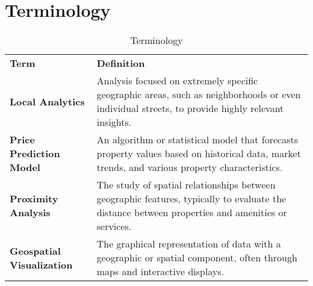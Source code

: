 \newpage

\section{Terminology}

\begin{table}[htbp]
	\centering
	\renewcommand{\arraystretch}{1.3}
	\begin{tabular}{>{\raggedright\arraybackslash}p{}>{\raggedright\arraybackslash}p{}}
		\toprule \rowcolor[gray]{0.9} \textbf{Term}                           & \textbf{Definition}                                                                                                                                                       \\
		\addlinespace \textbf{Local Analytics}                           & Analysis focused on extremely specific geographic areas, such as neighborhoods or even individual streets, to provide highly relevant insights.                           	  \\
		\addlinespace \rowcolor[gray]{0.95} \textbf{Price Prediction Model}   & An algorithm or statistical model that forecasts property values based on historical data, market trends, and various property characteristics.                           \\
		\addlinespace \textbf{Proximity Analysis}                             & The study of spatial relationships between geographic features, typically to evaluate the distance between properties and amenities or services.                          \\
		\addlinespace \rowcolor[gray]{0.95} \textbf{Geospatial Visualization} & The graphical representation of data with a geographic or spatial component, often through maps and interactive displays.                                                 \\
		\bottomrule
	\end{tabular}
	\caption{Terminology}
	\label{tab:terminology}
\end{table}


